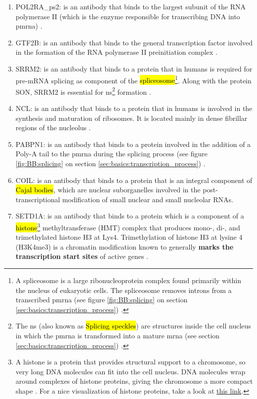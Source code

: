 \begin{enumerate}
  \item POL2RA\_ps2: is an antibody that binds to the largest subunit of the RNA polymerase II (which is the enzyme responsible for transcribing DNA into \gls{pmrna}) \cite{POLR2ApS2}.
  \item GTF2B: is an antibody that binds to the general transcription factor involved in the formation of the RNA polymerase II preinitiation complex \cite{lewin2004genes}.
  \item SRRM2: is an antibody that binds to a protein that in humans is required for pre-mRNA splicing as component of the \hl{spliceosome}\footnote{A spliceosome is a large ribonucleoprotein complex found primarily within the nucleus of eukaryotic cells. The spliceosome removes introns from a transcribed \gls{pmrna} (see figure \ref{fig:BB:splicing} on section \ref{sec:basics:transcription_process}) \cite{will2011spliceosome}.}. Along with the protein SON, SRRM2 is essential for \gls{ns}\footnote{The \gls{ns} (also known as \hl{Splicing speckles}) are structures inside the cell nucleus in which the \gls{pmrna} is transformed into a mature \gls{mrna} (see section \ref{sec:basics:transcription_process}) \cite{spector2011nuclear}.} formation \cite{ilik2020and}.
  \item NCL: is an antibody that binds to a protein that in humans is involved in the synthesis and maturation of ribosomes. It is located mainly in dense fibrillar regions of the nucleolus \cite{erard1988major}.
  \item PABPN1: is an antibody that binds to a protein involved in the addition of a Poly-A tail to the \gls{pmrna} during the splicing process (see figure \ref{fig:BB:splicing} on section \ref{sec:basics:transcription_process}) \cite{muniz2015poly}.
  \item COIL: is an antibody that binds to a protein that is an integral component of \hl{Cajal bodies}, which are nuclear suborganelles involved in the post-transcriptional modification of small nuclear and small nucleolar RNAs\cite{COIL}.
  \item SETD1A: is an antibody that binds to a protein which is a component of a \hl{histone}\footnote{A histone is a protein that provides structural support to a chromosome, so very long DNA molecules can fit into the cell nucleus. DNA molecules wrap around complexes of histone proteins, giving the chromosome a more compact shape \cite{youngson2006collins}. For a nice visualization of histone proteins, take a look at \href{https://www.genome.gov/genetics-glossary/histone}{this link}.} methyltransferase (HMT) complex that produces mono-, di-, and trimethylated histone H3 at Lys4. Trimethylation of histone H3 at lysine 4 (H3K4me3) is a chromatin modification known to generally \textbf{marks the transcription start sites} of active genes \cite{SETD1A}.
\end{enumerate}

